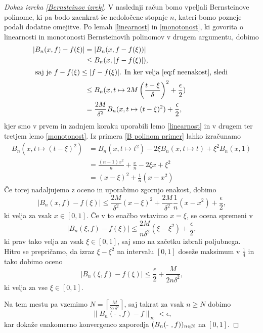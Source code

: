 \documentclass[a4paper, reqno]{amsart}
\theoremstyle{theorem}
\theoremstyle{definition}
\begin{document}
\begin{proof}[Dokaz \emph{izreka \ref{Bernsteinov izrek}}]
V naslednji račun bomo vpeljali Bernsteinove polinome, ki pa bodo zaenkrat še
nedoločene stopnje $n$, kateri bomo pozneje podali dodatne omejitve. Po lemah 
\ref{linearnost} in \ref{monotonost}, ki govorita o linearnosti in monotonosti 
Bernsteinovih polinomov v drugem argumentu, dobimo
\begin{align*}
	|B_n(x, f) - f(\xi)| &= |B_n(x, f - f(\xi))|\\
	&\leq B_n(x, |f - f(\xi)|)\text{,}\\
\intertext{
		saj je $f - f(\xi) \leq |f - f(\xi)|$. In ker velja \eqref{eq:f neenakost}, sledi
}
	&\leq B_n(x, t \mapsto 2M\left(\frac{t - \xi}{\delta} \right)^2 + \frac{\epsilon}{2})\\
	&= \frac{2M}{\delta^2}B_n(x, t \mapsto (t - \xi)^2) + \frac{\epsilon}{2}\text{,}
\end{align*}
kjer smo v prvem in zadnjem koraku uporabili lemo \ref{linearnost} in v drugem ter
tretjem lemo \ref{monotonost}. Iz primera \ref{B polinom primer} lahko izračunamo
\begin{align*}
	B_n(x, t \mapsto (t - \xi)^2) &= 
	B_n(x, t \mapsto t^2) - 2\xi B_n(x, t \mapsto t) + \xi^2B_n(x, 1) \\
	&= \frac{(n - 1)x^2}{n} + \frac xn - 2\xi x + \xi^2 \\
	&= (x - \xi)^2 + \frac{1}{n}(x - x^2)
\end{align*}
Če torej nadaljujemo z oceno in uporabimo zgornjo enakost, dobimo
$$
|B_n(x, f) - f(\xi)| \leq \frac{2M}{\delta^2}(x - \xi)^2 + 
\frac{2M}{\delta^2}\frac{1}{n}(x - x^2) + \frac{\epsilon}{2}\text{,}
$$
ki velja za vsak $x \in [0,1]$. Če v to enačbo vstavimo $x = \xi$, se ocena spremeni v
$$
|B_n(\xi, f) - f(\xi)| \leq  \frac{2M}{n\delta^2}(\xi - \xi^2) + \frac{\epsilon}{2}\text{,}
$$
ki prav tako velja za vsak $\xi \in [0,1]$, saj smo na začetku izbrali poljubnega. Hitro
se prepričamo, da izraz $\xi - \xi^2$ na intervalu $[0,1]$ doseže maksimum v $\frac{1}{4}$
in tako dobimo oceno
$$
|B_n(\xi, f) - f(\xi)| \leq \frac{\epsilon}{2} + \frac{M}{2n\delta^2}\text{,}
$$ 
ki velja za vse $\xi \in [0,1]$.

\par
Na tem mestu pa vzemimo $N = \left \lceil{\frac{M}{2\epsilon\delta^2}}\right \rceil$, saj
takrat za vsak $n \geq N$ dobimo
$$
\|B_n(\text{- }, f) - f\|_{\infty} < \epsilon\text{,}
$$
kar dokaže enakomerno konvergenco zaporedja $(B_n(\text{- },f))_{n \in \mathbb{N}}$ na $[0,1]$.
\end{proof}
\end{document}
